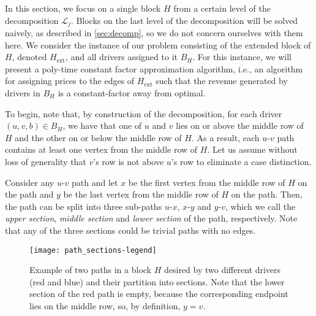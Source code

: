 \newcommand{\locrevab}[2]{\mathrm{#1}^{\mathrm{#2}}_{H, a, b}}
\newcommand{\locreva}[2]{\mathrm{#1}^{\mathrm{#2}}_{H, a}}
\newcommand{\locrev}[2]{\mathrm{#1}^{\mathrm{#2}}_{H}}

In this section, we focus on a single block $H$ from a certain level of the decomposition $\mathcal{L}_j$.
%
Blocks on the last level of the decomposition will be solved naively, as described in \cref{sec:decomp}, so we do not concern ourselves with them here. We consider the instance of our problem consisting of the extended block of $H$, denoted $H_{\mathrm{ext}}$, and all drivers assigned to it $B_H$. For this instance, we will present a poly-time
constant factor approximation algorithm, i.e., an algorithm for assigning prices to the edges of $H_{\mathrm{ext}}$ such that the revenue generated by drivers in $B_H$ is a constant-factor away from optimal.

To begin, note that, by construction of the decomposition, for each driver $(u, v, b) \in B_H$, we have that one of $u$ and $v$ lies on or above the middle row of $H$ and the other on or below the middle row of $H$. As a result, each $u$-$v$ path contains at least one vertex from the middle row of $H$. Let us assume without loss of generality that $v$'s row is not above $u$'s row to eliminate a
case distinction. 

Consider any $u$-$v$ path and let $x$ be the first vertex from the middle row of $H$ on the path and $y$ be the last vertex from the middle row of $H$ on the path. Then, the path can be split into three sub-paths $u$-$x$, $x$-$y$ and $y$-$v$, which we call the \emph{upper section}, \emph{middle section} and \emph{lower section} of the path, respectively. Note that any of the three sections could be trivial paths with no edges.

\begin{figure}[t]
    \centering
    \texttt{[image: path\_sections-legend]}
    \caption{
        Example of two paths in a block $H$ desired by two different drivers (red and blue) and their partition into sections.
        Note that the lower section of the red path is empty, because the corresponding endpoint lies on the middle row, so, by definition, $y = v$.
    }
\end{figure}

